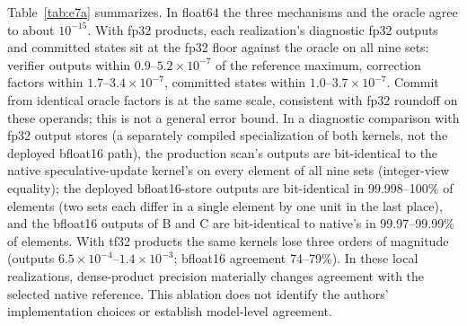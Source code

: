 \documentclass[conference]{IEEEtran}
\begin{document}
Table~\ref{tab:e7a} summarizes. In float64 the three mechanisms and the oracle agree to about $10^{-15}$. With fp32 products, each realization's diagnostic fp32 outputs and committed states sit at the fp32 floor against the oracle on all nine sets: verifier outputs within $0.9$--$5.2\times10^{-7}$ of the reference maximum, correction factors within $1.7$--$3.4\times10^{-7}$, committed states within $1.0$--$3.7\times10^{-7}$. Commit from identical oracle factors is at the same scale, consistent with fp32 roundoff on these operands; this is not a general error bound. In a diagnostic comparison with fp32 output stores (a separately compiled specialization of both kernels, not the deployed bfloat16 path), the production scan's outputs are bit-identical to the native speculative-update kernel's on every element of all nine sets (integer-view equality); the deployed bfloat16-store outputs are bit-identical in 99.998--100\% of elements (two sets each differ in a single element by one unit in the last place), and the bfloat16 outputs of B and C are bit-identical to native's in 99.97--99.99\% of elements. With tf32 products the same kernels lose three orders of magnitude (outputs $6.5\times10^{-4}$--$1.4\times10^{-3}$; bfloat16 agreement 74--79\%). In these local realizations, dense-product precision materially changes agreement with the selected native reference. This ablation does not identify the authors' implementation choices or establish model-level agreement.
\end{document}
